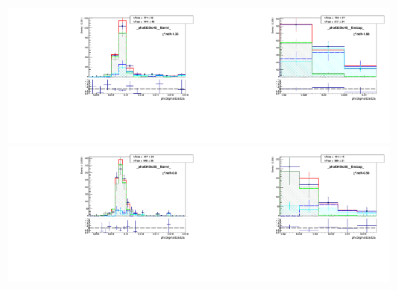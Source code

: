 \begin{figure}[htb]
  \begin{center}
   \includegraphics[width=0.45\textwidth]{../figs/figs_v11/ELECTRON_WGamma/MCclosureWjetsPlusWg/c_TEMPL_SIHIH_UNblind__phoEt35to45__Barrel__RooFit_MCclosure.pdf}\includegraphics[width=0.45\textwidth]{../figs/figs_v11/ELECTRON_WGamma/MCclosureWjetsPlusWg/c_TEMPL_SIHIH_UNblind__phoEt35to45__Endcap__RooFit_MCclosure.pdf}\\
   \includegraphics[width=0.45\textwidth]{../figs/figs_v11/ELECTRON_WGamma/MCclosureWjetsPlusWg/c_TEMPL_SIHIH_UNblind__phoEt45to55__Barrel__RooFit_MCclosure.pdf}\includegraphics[width=0.45\textwidth]{../figs/figs_v11/ELECTRON_WGamma/MCclosureWjetsPlusWg/c_TEMPL_SIHIH_UNblind__phoEt45to55__Endcap__RooFit_MCclosure.pdf}\\

\end{center}
\end{figure}
